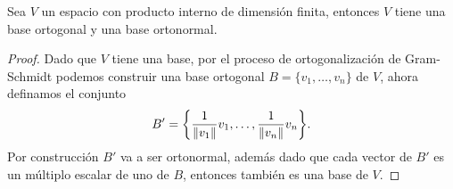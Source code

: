 \begin{coro}
  Sea $V$ un espacio con producto interno de dimensión finita, entonces $V$ tiene una base ortogonal y una base ortonormal.
\end{coro}
\begin{proof}
  Dado que $V$ tiene una base, por el proceso de ortogonalización de Gram-Schmidt podemos construir una base ortogonal $B = \{v_1,\ldots,v_n\}$ de $V$, ahora definamos el conjunto
    \[
      B' = \set{ \frac{1}{\norm{v_1}}v_1, \ldots, \frac{1}{\norm{v_n}}v_n }.
    \]
  Por construcción $B'$ va a ser ortonormal, además dado que cada vector de $B'$ es un múltiplo escalar de uno de $B$, entonces también es una base de $V$.
\end{proof}